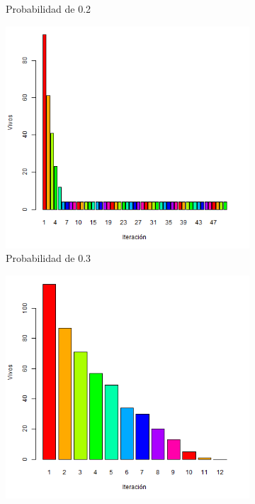 \documentclass{article}
\begin{document}
\begin{figure}
\begin{subfigure}[b]{0.4\linewidth}
\caption{Probabilidad de 0.2}
\label{prob2}
\end{subfigure}
\begin{subfigure}[b]{0.4\linewidth}
\includegraphics[width=\linewidth]{prob0-3.png}
\caption{Probabilidad de 0.3}
\label{prob3}
\end{subfigure}
\begin{subfigure}[b]{0.4\linewidth}
\includegraphics[width=\linewidth]{prob0-4.png}

\end{subfigure}
\end{figure}
\end{document}
